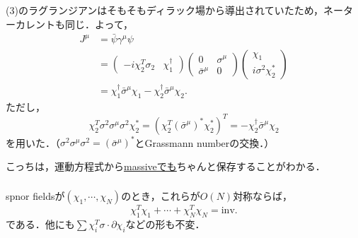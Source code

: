 \documentclass[pdflatex,unicode,ja=standard,12pt]{beamer}
\begin{document}
\begin{frame}
  
  \frametitle{\subsecname}

  (3)のラグランジアンはそもそもディラック場から導出されていたため，ネーターカレントも同じ．よって，
  \begin{align}
    J^{\mu}
    &=
    \bar{\psi}\gamma^{\mu}\psi
    \nonumber
    \\
    &=
    \begin{pmatrix}
      -i\chi_2^{T}\sigma_2 & \chi_1^{\dag}
    \end{pmatrix}
    \begin{pmatrix}
      0 & \sigma^{\mu} \\
      \bar{\sigma}^{\mu} & 0
    \end{pmatrix}
    \begin{pmatrix}
      \chi_1 \\
      i\sigma^2\chi_2^{*}
    \end{pmatrix}
    \nonumber
    \\
    &=
    \chi_1^{\dag}\bar{\sigma}^{\mu}\chi_1
    -
    \chi_2^{\dag}\bar{\sigma}^{\mu}\chi_2
    .
  \end{align}
  ただし，
  \begin{equation}
    \chi_2^{T}\sigma^2\sigma^{\mu}\sigma^2\chi_2^{*}
    =
    (\chi_2^{T}(\bar{\sigma}^{\mu})^*\chi_2^{*})^{T}
    =
    -\chi_2^{\dag}\bar{\sigma}^{\mu}\chi_2
  \end{equation}
  を用いた．（$\sigma^2\sigma^{\mu}\sigma^2=(\bar{\sigma}^{\mu})^*$とGrassmann numberの交換．）

  \vspace{10pt}

  こっちは，運動方程式から\uline{massiveでも}ちゃんと保存することがわかる．
  
\end{frame}


\begin{frame}
  
  \frametitle{\subsecname}

  spnor fieldsが$(\chi_1,\cdots,\chi_N)$のとき，これらが$O(N)$対称ならば，
  \begin{equation}
    \chi_1^{T}\chi_1
    +
    \cdots
    +
    \chi_N^{T}\chi_N
    =
    \mathrm{inv.}
  \end{equation}
  である．他にも$\sum\chi_i^{T}\sigma\cdot\partial\chi_i$などの形も不変．

\end{frame}
\end{document}
